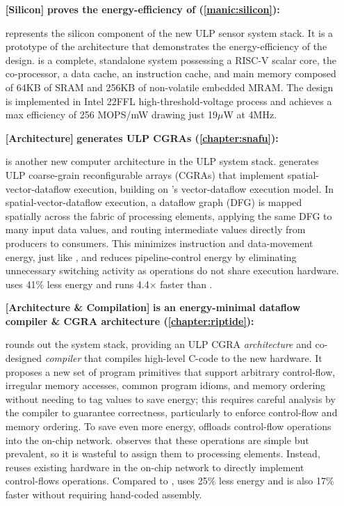 \begin{itemize}
\item[\textbf{[Silicon]}]
\textbf{\msilicon proves the energy-efficiency of \manic (\autoref{manic:silicon}): }

\msilicon represents the silicon component of the new ULP sensor system stack.
% 
It is a prototype of the \manic architecture that demonstrates the energy-efficiency of the design.
% 
\msilicon is a complete, standalone system possessing a RISC-V scalar core, the \manic co-processor, a data cache, an instruction cache, and main memory composed of 64KB of SRAM and 256KB of non-volatile embedded MRAM.
% 
The design is implemented in Intel 22FFL high-threshold-voltage process and achieves a max efficiency of 256 MOPS/mW drawing just 19$\mu$W at 4MHz.
% 

\item[\textbf{[Architecture]}]
\textbf{\snafu generates ULP CGRAs (\autoref{chapter:snafu}): }

\snafu is another new computer architecture in the ULP system stack.
% 
\snafu generates ULP coarse-grain reconfigurable arrays (CGRAs) that implement spatial-vector-dataflow execution, building on \manic's vector-dataflow execution model.
% 
% 
In spatial-vector-dataflow execution, a dataflow graph (DFG) is mapped spatially across the fabric of processing elements, applying the same DFG to many input data values, and routing intermediate values directly from producers to consumers.
% 
This minimizes instruction and data-movement energy, just like \manic, and reduces pipeline-control energy by eliminating unnecessary switching activity as operations do not share execution hardware.
% 
\snafu uses 41$\%$ less energy and runs 4.4$\times$ faster than \manic.
% 

\item[\textbf{[Architecture \& Compilation]}]
\textbf{\riptide is an energy-minimal dataflow compiler \& CGRA architecture (\autoref{chapter:riptide}): }

\riptide rounds out the system stack, providing an ULP CGRA \emph{architecture} and co-designed \emph{compiler} that compiles high-level C-code to the new hardware.
% 
It proposes a new set of program primitives that support arbitrary control-flow, irregular memory accesses, common program idioms, and memory ordering without needing to tag values to save energy; this requires careful analysis by the compiler to guarantee correctness, particularly to enforce control-flow and memory ordering.
% 
To save even more energy, \riptide offloads control-flow operations into the on-chip network.
% 
\riptide observes that these operations are simple but prevalent, so it is wasteful to assign them to processing elements.
% 
Instead, \riptide reuses existing hardware in the on-chip network to directly implement control-flows operations.
% 
Compared to \snafu, \riptide uses 25\% less energy and is also 17\% faster without requiring hand-coded assembly.
% 

\end{itemize}

